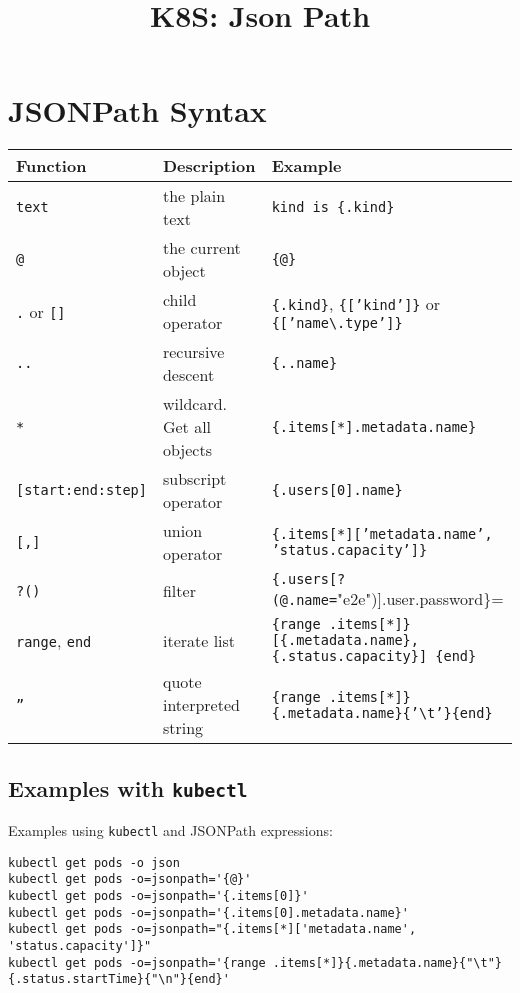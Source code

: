 \documentclass[a4paper,landscape]{article}
\date{}
\title{K8S: Json Path}
\begin{document}
\section{JSONPath Syntax}
\label{sec:orgb6a933d}

\begin{center}
\begin{tabular}{lll}
Function & Description & Example\\[0pt]
\hline
\texttt{text} & the plain text & \texttt{kind is \{.kind\}}\\[0pt]
\texttt{@} & the current object & \texttt{\{@\}}\\[0pt]
\texttt{.} or \texttt{[]} & child operator & \texttt{\{.kind\}}, \texttt{\{['kind']\}} or \texttt{\{['name\textbackslash{}.type']\}}\\[0pt]
\texttt{..} & recursive descent & \texttt{\{..name\}}\\[0pt]
\texttt{*} & wildcard. Get all objects & \texttt{\{.items[*].metadata.name\}}\\[0pt]
\texttt{[start:end:step]} & subscript operator & \texttt{\{.users[0].name\}}\\[0pt]
\texttt{[,]} & union operator & \texttt{\{.items[*]['metadata.name', 'status.capacity']\}}\\[0pt]
\texttt{?()} & filter & \texttt{\{.users[?(@.name=}"e2e")].user.password\}=\\[0pt]
\texttt{range}, \texttt{end} & iterate list & \texttt{\{range .items[*]\}[\{.metadata.name\}, \{.status.capacity\}] \{end\}}\\[0pt]
\texttt{''} & quote interpreted string & \texttt{\{range .items[*]\}\{.metadata.name\}\{'\textbackslash{}t'\}\{end\}}\\[0pt]
\end{tabular}
\end{center}

\subsection{Examples with \texttt{kubectl}}
\label{sec:org7159da4}

Examples using \texttt{kubectl} and JSONPath expressions:

\begin{verbatim}
kubectl get pods -o json
kubectl get pods -o=jsonpath='{@}'
kubectl get pods -o=jsonpath='{.items[0]}'
kubectl get pods -o=jsonpath='{.items[0].metadata.name}'
kubectl get pods -o=jsonpath="{.items[*]['metadata.name', 'status.capacity']}"
kubectl get pods -o=jsonpath='{range .items[*]}{.metadata.name}{"\t"}{.status.startTime}{"\n"}{end}'
\end{verbatim}
\end{document}

